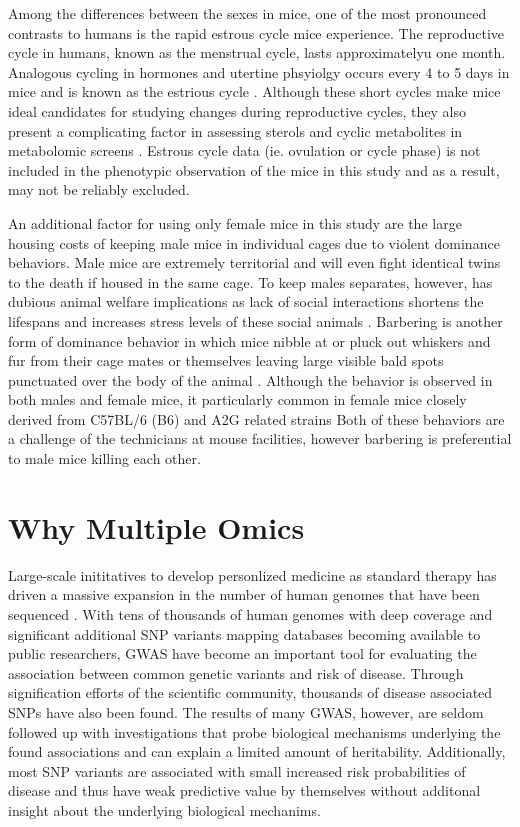 \documentclass[a4paper,11pt,twoside]{book}
\begin{document}
    Among the differences between the sexes in mice, one of the most pronounced contrasts to humans is the rapid estrous cycle mice experience. The reproductive cycle in humans, known as the menstrual cycle, lasts approximatelyu one month. Analogous cycling in hormones and utertine phsyiolgy occurs every 4 to 5 days in mice and is known as the estrious cycle \citep{Caligioni2009}. Although these short cycles make mice ideal candidates for studying changes during reproductive cycles, they also present a complicating factor in assessing sterols and cyclic metabolites in metabolomic screens \citep{Zucker2010MalesStudies}. Estrous cycle data (ie. ovulation or cycle phase) is not included in the phenotypic observation of the mice in this study and as a result, may not be reliably excluded.
	
    An additional factor for using only female mice in this study are the large housing costs of keeping male mice in individual cages due to violent dominance behaviors. Male mice are extremely territorial and will even fight identical twins to the death if housed in the same cage. To keep males separates, however, has dubious animal welfare implications as lack of social interactions shortens the lifespans and increases stress levels of these social animals \citep{PeterKelmenson}. Barbering is another form of dominance behavior in which mice nibble at or pluck out whiskers and fur from their cage mates or themselves leaving large visible bald spots punctuated over the body of the animal \citep{PeterKelmenson}. Although the behavior is observed in both males and female mice, it particularly common in female mice closely derived from C57BL/6 (B6) and A2G related strains \citep{Kalueff2006HairResearch} Both of these behaviors are a challenge of the technicians at mouse facilities, however barbering is preferential to male mice killing each other.
		
	\section{Why Multiple Omics}
	
    Large-scale inititatives to develop personlized medicine as standard therapy has driven a massive expansion in the number of human genomes that have been sequenced \citep{Telenti2016Deepgenomes, Fakhro2016}. With tens of thousands of human genomes with deep coverage \citep{Telenti2016Deepgenomes} and significant additional SNP variants mapping databases becoming available to public researchers, GWAS have become an important tool for evaluating the association between common genetic variants and risk of disease. Through signification efforts of the scientific community, thousands of disease associated SNPs have also been found\citep{Johnson2009AnResults.}. The results of many GWAS, however, are seldom followed up with investigations that probe biological mechanisms underlying the found associations and can explain a limited amount of heritability. Additionally, most SNP variants are associated with small increased risk probabilities of disease and thus have weak predictive value by themselves without additonal insight about the underlying biological mechanims. 
	
\end{document}
